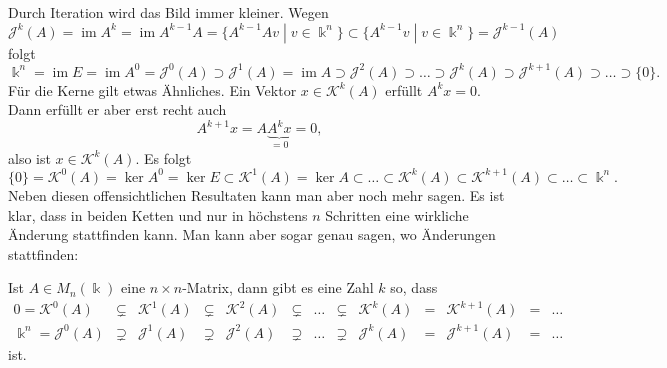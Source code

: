Durch Iteration wird das Bild immer kleiner.
Wegen
\[
\mathcal{J}^k (A)
=
\operatorname{im} A^k
=
\operatorname{im} A^{k-1} A
=
\{ A^{k-1} Av\;|\; v \in \Bbbk^n\}
\subset
\{ A^{k-1} v\;|\; v \in \Bbbk^n\}
=
\mathcal{J}^{k-1}(A)
\]
folgt
\begin{equation}
\Bbbk^n
=
\operatorname{im}E
=
\operatorname{im}A^0
=
\mathcal{J}^0(A)
\supset
\mathcal{J}^1(A)
=
\operatorname{im}A
\supset
\mathcal{J}^2(A)
\supset\dots\supset
\mathcal{J}^k(A)
\supset
\mathcal{J}^{k+1}(A)
\supset \dots \supset
\{0\}.
\label{buch:eigenwerte:eqn:Jkchain}
\end{equation}
Für die Kerne gilt etwas Ähnliches.
Ein Vektor $x\in \mathcal{K}^k(A)$ erfüllt $A^kx=0$.
Dann erfüllt er aber erst recht auch
\[
A^{k+1}x=A\underbrace{A^kx}_{\displaystyle=0}=0,
\]
also ist $x\in\mathcal{K}^k(A)$.
Es folgt
\begin{equation}
\{0\}
=
\mathcal{K}^0(A) = \ker A^0 = \ker E
\subset
\mathcal{K}^1(A) = \ker A
\subset
\dots
\subset
\mathcal{K}^k(A)
\subset
\mathcal{K}^{k+1}(A)
\subset
\dots
\subset
\Bbbk^n.
\label{buch:eigenwerte:eqn:Kkchain}
\end{equation}
Neben diesen offensichtlichen Resultaten kann man aber noch mehr
sagen.
Es ist klar, dass in beiden Ketten
\label{buch:eigenwerte:eqn:Jkchain}
und
\label{buch:eigenwerte:eqn:Kkchain}
nur in höchstens $n$ Schritten eine wirkliche Änderung stattfinden 
kann.
Man kann aber sogar genau sagen, wo Änderungen stattfinden:

\begin{satz}
\label{buch:eigenwerte:satz:ketten}
Ist $A\in M_n(\Bbbk)$ eine $n\times n$-Matrix, dann gibt es eine Zahl $k$
so, dass
\[
\begin{array}{rcccccccccccl}
0=\mathcal{K}^0(A)
&\subsetneq& \mathcal{K}^1(A) &\subsetneq& \mathcal{K}^2(A)
&\subsetneq&\dots&\subsetneq&
\mathcal{K}^k(A) &=& \mathcal{K}^{k+1}(A) &=& \dots
\\
\Bbbk^n= \mathcal{J}^0(A)
&\supsetneq& \mathcal{J}^1(A) &\supsetneq& \mathcal{J}^2(A)
&\supsetneq&\dots&\supsetneq&
\mathcal{J}^k(A) &=& \mathcal{J}^{k+1}(A) &=& \dots
\end{array}
\]
ist.
\end{satz}

